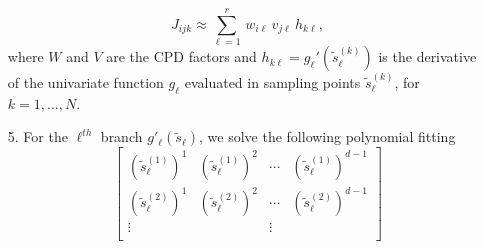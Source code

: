 \documentclass[review]{elsarticle}
\begin{document}
\begin{itemize}
\begin{figure}[ht]
\begin{center}
\label{fig:StackingGrads}
\end{center}
\end{figure}
\begin{equation}
J_{ijk} \approx \sum_{\ell = 1}^{r} \, w_{i\ell} \, v_{j\ell} \, h_{k\ell},\label{eq:DECEQ}
\end{equation}
where $W$ and $V$ are the CPD factors and
$h_{k\ell}= {g_\ell}'(\tilde{s}_\ell^{(k)})%
$
is the derivative of the univariate function $g_\ell$ evaluated in sampling points $\tilde{s}_\ell^{(k)}$, for $k = 1, \ldots, N$. 
\item[5.] For the $\ell^{th}$ branch ${g}'_\ell(\tilde{s}_\ell)$, we solve the following polynomial fitting
\begin{equation}
\begin{bmatrix}
(\tilde{s}_{\ell}^{(1)})^1 & (\tilde{s}_{\ell}^{(1)})^2 & \cdots & (\tilde{s}_{\ell}^{(1)})^{d-1} \\
(\tilde{s}_{\ell}^{(2)})^1 & (\tilde{s}_{\ell}^{(2)})^2 & \cdots & (\tilde{s}_{\ell}^{(2)})^{d-1} \\
\vdots && \vdots\\

\end{bmatrix}
\end{equation}
\end{itemize}
\end{document}
